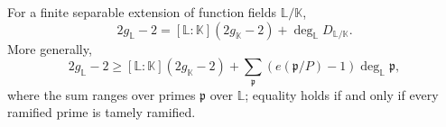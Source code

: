\begin{theorem}
\label{par-thm-hurwitz}
\uses{}
For a finite separable extension of function fields $\mathbb L/\mathbb K$,
\[
2g_{\mathbb L}-2=[\mathbb L:\mathbb K](2g_{\mathbb K}-2)
 +\deg_{\mathbb L}D_{\mathbb L/\mathbb K}.
\]
More generally,
\[
2g_{\mathbb L}-2\geq[\mathbb L:\mathbb K](2g_{\mathbb K}-2)
 +\sum_{\mathfrak p}(e(\mathfrak p/P)-1)\deg_{\mathbb L}\mathfrak p,
\]
where the sum ranges over primes $\mathfrak p$ over $\mathbb L$; equality holds
if and only if every ramified prime is tamely ramified.
\end{theorem}
